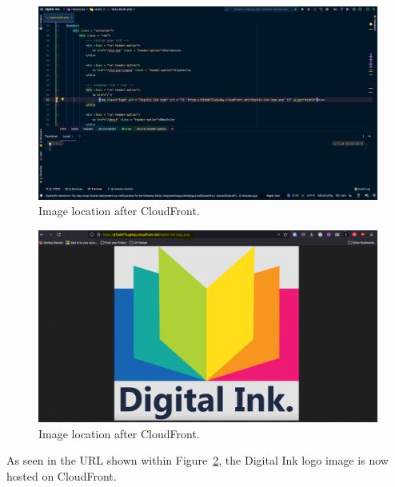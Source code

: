 \clearpage
\begin{figure}[!htbp]
    \centering
    \includegraphics[width=\textwidth]{resources/cloudfront/cloudfront-after}
    \caption{Image location after CloudFront.}
    \label{fig:cloudfront-after}
\end{figure}

\begin{figure}[!htbp]
    \centering
    \includegraphics[width=\textwidth]{resources/cloudfront/cloudfront-website}
    \caption{Image location after CloudFront.}
    \label{fig:cloudfront-website}
\end{figure}

As seen in the URL shown within Figure~\ref{fig:cloudfront-website}, the Digital Ink logo image is now hosted on
CloudFront.
